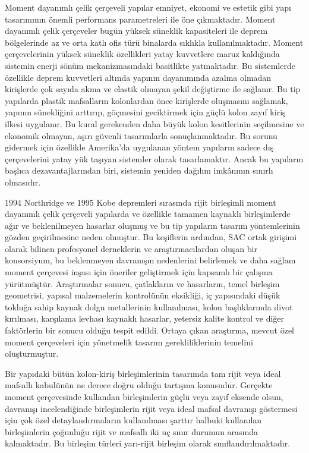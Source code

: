 Moment dayanımlı çelik çerçeveli yapılar emniyet, ekonomi ve estetik
gibi yapı tasarımının önemli performans parametreleri ile öne çıkmaktadır.
Moment dayanımlı çelik çerçeveler bugün yüksek süneklik kapasiteleri
ile deprem bölgelerinde az ve orta katlı ofis türü binalarda sıklıkla
kullanılmaktadır. Moment çerçevelerinin yüksek süneklik özellikleri
yatay kuvvetlere maruz kaldığında sistemin enerji sönüm mekanizmasındaki
basitlikte yatmaktadır. Bu sistemlerde özellikle deprem kuvvetleri
altında yapının dayanımında azalma olmadan kirişlerde çok sayıda akma
ve elastik olmayan şekil değiştirme ile sağlanır. Bu tip yapılarda
plastik mafsalların kolonlardan önce kirişlerde oluşmasını sağlamak,
yapının sünekliğini arttırıp, göçmesini geciktirmek için güçlü kolon
zayıf kiriş ilkesi uygulanır. Bu kural gerekenden daha büyük kolon
kesitlerinin seçilmesine ve ekonomik olmayan, aşırı güvenli tasarımlarla
sonuçlanmaktadır. Bu sorunu gidermek için özellikle Amerika’da uygulanan
yöntem yapıların sadece dış çerçevelerini yatay yük taşıyan sistemler
olarak tasarlamaktır. Ancak bu yapıların başlıca dezavantajlarından
biri, sistemin yeniden dağılım imkânının sınırlı olmasıdır.

1994 Northridge ve 1995 Kobe depremleri sırasında rijit birleşimli
moment dayanımlı çelik çerçeveli yapılarda ve özellikle tamamen kaynaklı
birleşimlerde ağır ve beklenilmeyen hasarlar oluşmuş ve bu tip yapıların
tasarım yöntemlerinin gözden geçirilmesine neden olmuştur. Bu keşiflerin
ardından, SAC ortak girişimi olarak bilinen profesyonel derneklerin
ve araştırmacılardan oluşan bir konsorsiyum, bu beklenmeyen davranışın
nedenlerini belirlemek ve daha sağlam moment çerçevesi inşası için
öneriler geliştirmek için kapsamlı bir çalışma yürütmüştür. Araştırmalar
sonucu, çatlakların ve hasarların, temel birleşim geometrisi, yapısal
malzemelerin kontrolünün eksikliği, iç yapısındaki düşük tokluğa sahip
kaynak dolgu metallerinin kullanılması, kolon başlıklarında divot
kırılması, karşılama levhası kaynaklı hasarlar, yetersiz kalite kontrol
ve diğer faktörlerin bir sonucu olduğu tespit edildi. Ortaya çıkan
araştırma, mevcut özel moment çerçeveleri için yönetmelik tasarım
gerekliliklerinin temelini oluşturmuştur.

Bir yapıdaki bütün kolon-kiriş birleşimlerinin tasarımda tam rijit
veya ideal mafsallı kabulünün ne derece doğru olduğu tartışma konusudur.
Gerçekte moment çerçevesinde kullanılan birleşimlerin güçlü veya zayıf
eksende olsun, davranışı incelendiğinde birleşimlerin rijit veya ideal
mafsal davranışı göstermesi için çok özel detaylandırmaların kullanılması
şarttır halbuki kullanılan birleşimlerin çoğunluğu rijit ve mafsallı
iki uç sınır durumun arasında kalmaktadır. Bu birleşim türleri yarı-rijit
birleşim olarak sınıflandırılmaktadır.

